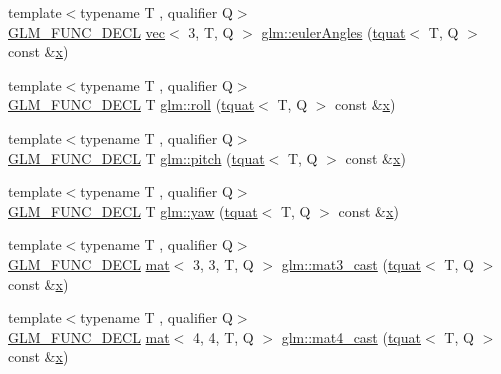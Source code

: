 \begin{DoxyCompactItemize}
\item 
{\footnotesize template$<$typename T , qualifier Q$>$ }\\\mbox{\hyperlink{setup_8hpp_ab2d052de21a70539923e9bcbf6e83a51}{G\+L\+M\+\_\+\+F\+U\+N\+C\+\_\+\+D\+E\+CL}} \mbox{\hyperlink{structglm_1_1vec}{vec}}$<$ 3, T, Q $>$ \mbox{\hyperlink{group__gtc__quaternion_gaf21424fa62e03de8b11c2b776c17d7a3}{glm\+::euler\+Angles}} (\mbox{\hyperlink{structglm_1_1tquat}{tquat}}$<$ T, Q $>$ const \&\mbox{\hyperlink{_s_d_l__opengl_8h_ad0e63d0edcdbd3d79554076bf309fd47}{x}})
\item 
{\footnotesize template$<$typename T , qualifier Q$>$ }\\\mbox{\hyperlink{setup_8hpp_ab2d052de21a70539923e9bcbf6e83a51}{G\+L\+M\+\_\+\+F\+U\+N\+C\+\_\+\+D\+E\+CL}} T \mbox{\hyperlink{group__gtc__quaternion_ga3ff93afbd9cc29f2ad217f2228e8a95b}{glm\+::roll}} (\mbox{\hyperlink{structglm_1_1tquat}{tquat}}$<$ T, Q $>$ const \&\mbox{\hyperlink{_s_d_l__opengl_8h_ad0e63d0edcdbd3d79554076bf309fd47}{x}})
\item 
{\footnotesize template$<$typename T , qualifier Q$>$ }\\\mbox{\hyperlink{setup_8hpp_ab2d052de21a70539923e9bcbf6e83a51}{G\+L\+M\+\_\+\+F\+U\+N\+C\+\_\+\+D\+E\+CL}} T \mbox{\hyperlink{group__gtc__quaternion_ga9bd78e5fe153d07e39fb4c83e73dba73}{glm\+::pitch}} (\mbox{\hyperlink{structglm_1_1tquat}{tquat}}$<$ T, Q $>$ const \&\mbox{\hyperlink{_s_d_l__opengl_8h_ad0e63d0edcdbd3d79554076bf309fd47}{x}})
\item 
{\footnotesize template$<$typename T , qualifier Q$>$ }\\\mbox{\hyperlink{setup_8hpp_ab2d052de21a70539923e9bcbf6e83a51}{G\+L\+M\+\_\+\+F\+U\+N\+C\+\_\+\+D\+E\+CL}} T \mbox{\hyperlink{group__gtc__quaternion_ga53feffeb4001b99e36e216522e465e9e}{glm\+::yaw}} (\mbox{\hyperlink{structglm_1_1tquat}{tquat}}$<$ T, Q $>$ const \&\mbox{\hyperlink{_s_d_l__opengl_8h_ad0e63d0edcdbd3d79554076bf309fd47}{x}})
\item 
{\footnotesize template$<$typename T , qualifier Q$>$ }\\\mbox{\hyperlink{setup_8hpp_ab2d052de21a70539923e9bcbf6e83a51}{G\+L\+M\+\_\+\+F\+U\+N\+C\+\_\+\+D\+E\+CL}} \mbox{\hyperlink{structglm_1_1mat}{mat}}$<$ 3, 3, T, Q $>$ \mbox{\hyperlink{group__gtc__quaternion_ga6e88f15c94effe737c876d21ea0db101}{glm\+::mat3\+\_\+cast}} (\mbox{\hyperlink{structglm_1_1tquat}{tquat}}$<$ T, Q $>$ const \&\mbox{\hyperlink{_s_d_l__opengl_8h_ad0e63d0edcdbd3d79554076bf309fd47}{x}})
\item 
{\footnotesize template$<$typename T , qualifier Q$>$ }\\\mbox{\hyperlink{setup_8hpp_ab2d052de21a70539923e9bcbf6e83a51}{G\+L\+M\+\_\+\+F\+U\+N\+C\+\_\+\+D\+E\+CL}} \mbox{\hyperlink{structglm_1_1mat}{mat}}$<$ 4, 4, T, Q $>$ \mbox{\hyperlink{group__gtc__quaternion_ga8e2085f17cd5aae423c04536524f11b3}{glm\+::mat4\+\_\+cast}} (\mbox{\hyperlink{structglm_1_1tquat}{tquat}}$<$ T, Q $>$ const \&\mbox{\hyperlink{_s_d_l__opengl_8h_ad0e63d0edcdbd3d79554076bf309fd47}{x}})

\end{DoxyCompactItemize}
